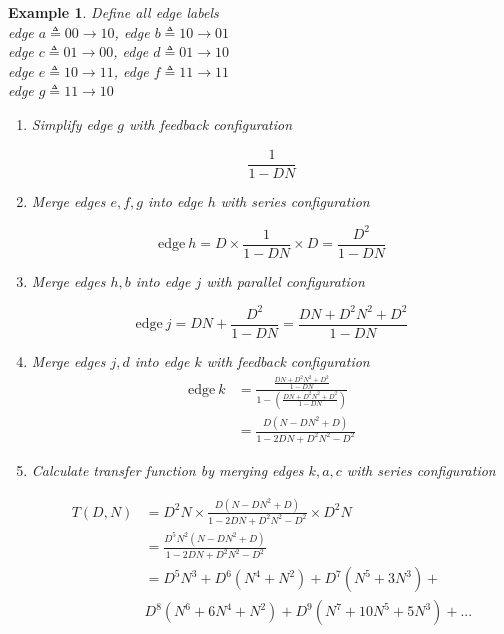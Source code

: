 \documentclass[fontsize=12pt]{article}
\newtheorem{example}[theorem]{Example}
\begin{document}
\begin{example} Define all edge labels\\
\label{ex3}
 edge $ a\triangleq 0 0 \rightarrow 1 0$,  edge $b \triangleq 1 0 \rightarrow 0 1$\\
 edge $ c \triangleq 0 1 \rightarrow 0 0$, edge $d \triangleq 0 1 \rightarrow 1 0$\\
 edge $ e \triangleq 1 0 \rightarrow 1 1$, edge $f \triangleq 1 1 \rightarrow 1 1$\\
 edge $ g \triangleq 1 1 \rightarrow 1 0$

\begin{enumerate}
\item Simplify edge $g$ with feedback configuration

$$ \frac{1}{1-DN}$$

\item Merge edges $e,f,g$ into edge $h$ with series configuration

$$\text{edge}~h = D\times \frac{1}{1-DN}\times D=\frac{D^2}{1-DN}$$

\item Merge edges $h,b$ into edge $j$ with parallel configuration

$$\text{edge}~j = DN+ \frac{D^2}{1-DN}= \frac{DN+D^2N^2+D^2}{1-DN}$$

\item Merge  edges $j,d$ into edge $k$ with feedback configuration
\begin{equation*}
\begin{split}
 \text{edge}~k&= \frac{\frac{DN+D^2N^2+D^2}{1-DN}}{1-(\frac{DN+D^2N^2+D^2}{1-DN})}\\
 &=\frac{D(N-DN^2+D)}{1-2DN+D^2N^2-D^2}
\end{split}
\end{equation*}

\item Calculate transfer function by merging edges $k,a,c$ with series configuration

\begin{equation*}
\begin{split}
T(D,N)&=D^2N \times \frac{D(N-DN^2+D)}{1-2DN+D^2N^2-D^2}\times D^2N \\
&=\frac{D^5N^2(N-DN^2+D)}{1-2DN+D^2N^2-D^2}\\
&=D^5N^3+D^6(N^4+N^2)+D^7(N^5+3N^3)+\\
&D^8(N^6+6N^4+N^2)+D^9(N^7+10N^5+5N^3)+...
\end{split}
\end{equation*}
\end{enumerate}
\end{example}
\end{document}
